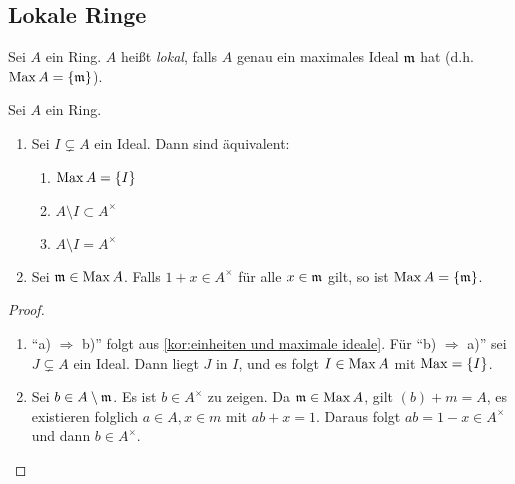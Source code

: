 \documentclass[12pt,a4paper]{scrartcl}
\theoremstyle{cplain}
\theoremstyle{cdef}
\begin{document}
\subsection{Lokale Ringe}
\begin{defi} \label{def1.5}
	Sei $A$ ein Ring. $A$ heißt \emph{lokal}, falls $A$ genau ein maximales Ideal $\mathfrak{m}$ hat (d.h. $\operatorname{Max} A = \{\mathfrak{m}\}$).
\end{defi}
\begin{lem} \label{lem:lokale ringe}
	Sei $A$ ein Ring.
	\begin{enumerate}
		\item Sei $I \subsetneq A$ ein Ideal. Dann sind äquivalent:
		      \begin{enumerate}
			      \item $\operatorname{Max} A = \{I\}$
			      \item $A \setminus I \subset A^{\times}$
			      \item $A \setminus I = A^{\times}$
		      \end{enumerate}
		\item Sei $\mathfrak{m} \in \operatorname{Max} A$. Falls $1+x \in A^{\times}$ für alle $x \in \mathfrak{m}$ gilt, so ist $\operatorname{Max} A=\{ \mathfrak{m} \}$.
	\end{enumerate}
    \begin{proof}
        \leavevmode
		\begin{enumerate}
			\item \enquote{a) $\Rightarrow$ b)} folgt aus \cref{kor:einheiten und maximale ideale}. Für \enquote{b) $\Rightarrow$ a)} sei $J \subsetneq A$ ein Ideal. Dann liegt $J$ in $I$, und es folgt $I \in \operatorname{Max} A$ mit $\operatorname{Max} = \{I\}$.
			\item Sei $b \in A \setminus \mathfrak{m}$. Es ist $b \in A^{\times}$ zu zeigen. Da $\mathfrak{m} \in \operatorname{Max} A$, gilt $(b)+m=A$, es existieren folglich $a \in A, x\in m$ mit $ab+x=1$. Daraus folgt $ab=1-x \in A^{\times}$ und dann $b \in A^{\times}$.
            \qedhere
        \end{enumerate}
	\end{proof}
\end{lem}
\end{document}
